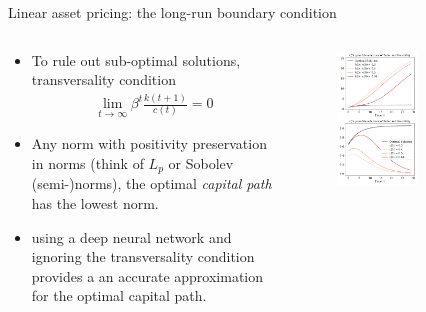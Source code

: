 \documentclass[aspectratio=169,10pt]{beamer}
\begin{document}
\begin{frame}{Linear asset pricing: the long-run boundary condition}
	\begin{columns}
		\begin{column}{0.5\textwidth}
			\begin{itemize}
				\item To rule out sub-optimal solutions, transversality condition
				\begin{align*}
					\lim_{t\rightarrow \infty}\beta^t \frac{k(t+1)}{c(t)} = 0
				\end{align*}
				\vspace{0.1in}
				\item Any norm with positivity preservation in norms (think of $L_p$ or Sobolev (semi-)norms), the optimal \emph{capital path} has the lowest norm.
				\vspace{0.1in}
				\item  using a deep neural network and ignoring the transversality condition provides a an accurate approximation for the optimal capital path.
			\end{itemize}
		\end{column}
		\begin{column}{0.5\textwidth}
			\begin{figure}[t!]
				\centering
				\includegraphics[width=0.6\textwidth]{figs/TVC_violation.pdf}
				\vspace{-7mm}
			\end{figure}
		\end{column}
	\end{columns}
\end{frame}
\end{document}
